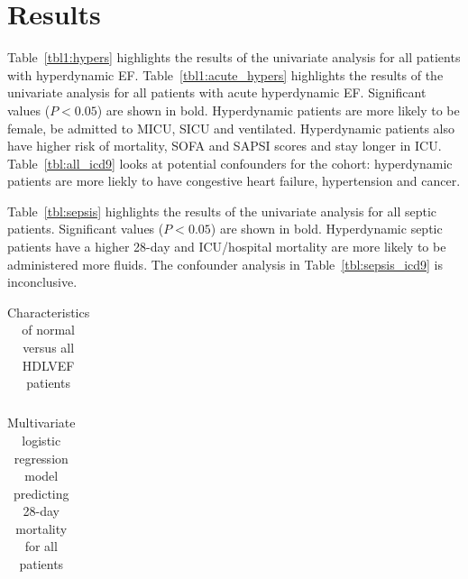 \documentclass[final,10pt]{elsarticle}
\begin{document}
\section{Results}
Table~\ref{tbl1:hypers} highlights the results of the univariate analysis 
for all patients with hyperdynamic EF. Table~\ref{tbl1:acute_hypers} highlights the results of the univariate analysis 
for all patients with acute hyperdynamic EF. Significant values ($P<0.05$) are shown in bold. 
Hyperdynamic patients are more likely to be female, be admitted to MICU, SICU 
and ventilated.
Hyperdynamic patients also have higher risk of mortality, SOFA and SAPSI scores and 
stay longer in ICU. Table~\ref{tbl:all_icd9} looks at potential confounders 
for the cohort: hyperdynamic patients are more liekly to have congestive heart failure, 
hypertension and cancer. 

Table~\ref{tbl:sepsis} highlights the results of the univariate 
analysis for all septic patients. Significant values ($P<0.05$) are shown in bold. 
Hyperdynamic septic patients have a higher 28-day and ICU/hospital mortality are more 
likely to be administered more fluids. The confounder analysis in 
Table~\ref{tbl:sepsis_icd9} is inconclusive.


\begin{table}[h]
\begin{tabular}{l c c c}
\toprule

\bottomrule
\end{tabular}
\caption{Characteristics of normal versus all HDLVEF patients}
\label{tbl:hypers}
\end{table}

%

%

\begin{table}[h]
\begin{tabular}{l c c}
\toprule

\bottomrule
\end{tabular}
\caption{Multivariate logistic regression model predicting 28-day mortality for all patients}
\label{tbl:all-comorb}
\end{table}
\end{document}
